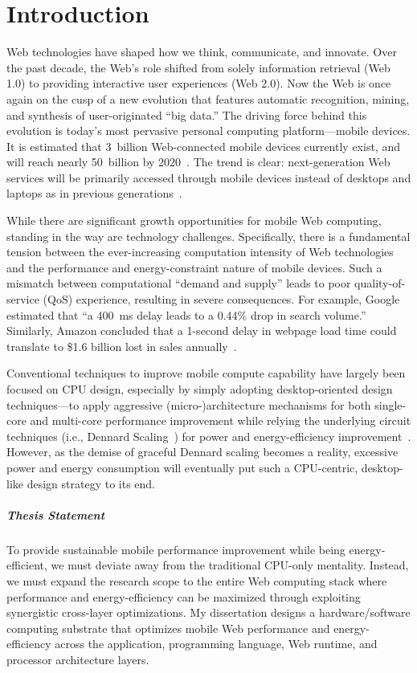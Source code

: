 
\chapter{Introduction}
\label{sec:intro}

Web technologies have shaped how we think, communicate, and innovate. Over the past decade, the Web's role shifted from solely information retrieval (Web 1.0) to providing interactive user experiences (Web 2.0). Now the Web is once again on the cusp of a new evolution that features automatic recognition, mining, and synthesis of user-originated ``big data.'' The driving force behind this evolution is today's most pervasive personal computing platform---mobile devices. It is estimated that 3~billion Web-connected mobile devices currently exist, and will reach nearly 50~billion by 2020~\cite{Evans:2011ys}. The trend is clear: next-generation Web services will be primarily accessed through mobile devices instead of desktops and laptops as in previous generations~\cite{KPCB-Internet-Trends15}.

While there are significant growth opportunities for mobile Web computing, standing in the way are technology challenges. Specifically, there is a fundamental tension between the ever-increasing computation intensity of Web technologies and the performance and energy-constraint nature of mobile devices. Such a mismatch between computational ``demand and supply'' leads to poor quality-of-service (QoS) experience, resulting in severe consequences. For example, Google estimated that ``a 400~ms delay leads to a 0.44\% drop in search volume.''~\cite{web:google} Similarly, Amazon concluded that a 1-second delay in webpage load time could translate to \$1.6 billion lost in sales annually~\cite{Eaton:2013uq}.

Conventional techniques to improve mobile compute capability have largely been focused on CPU design, especially by simply adopting desktop-oriented design techniques---to apply aggressive (micro-)architecture mechanisms for both single-core and multi-core performance improvement while relying the underlying circuit techniques (i.e., Dennard Scaling~\cite{dennard}) for power and energy-efficiency improvement~\cite{mobilecpu}. However, as the demise of graceful Dennard scaling becomes a reality, excessive power and energy consumption will eventually put such a CPU-centric, desktop-like design strategy to its end.

\paragraph{Thesis Statement} To provide sustainable mobile performance improvement while being energy-efficient, we must deviate away from the traditional CPU-only mentality. Instead, we must expand the research scope to the entire Web computing stack where performance and energy-efficiency can be maximized through exploiting synergistic cross-layer optimizations. My dissertation designs a hardware/software computing substrate that optimizes mobile Web performance and energy-efficiency across the application, programming language, Web runtime, and processor architecture layers.


